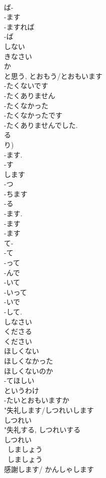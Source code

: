\documentclass[8pt]{extreport}
\begin{document}
\begin{CJK}{UTF8}{min}
\\	ば-
\\	-ます 
\\	-ますれば	
\\	-ば 
\\	しない			
\\	きなさい	
\\	か 
\\	と思う, とおもう/とおもいます 
\\	-たくないです 
\\	-たくありません			
\\	-たくなかった			
\\	-たくなかったです 
\\	-たくありませんでした.			
\\	る 
\\	り) 
\\	-ます. 
\\	-す 
\\	します
\\	-つ 
\\	-ちます
\\	-る 
\\	-ます.	
\\	-ます 
\\	-ます 
\\	て-
\\	-て
\\	-って
\\	-んで
\\	-いて
\\	-いって
\\	-いで
\\	-して.
\\	しなさい	
\\	くださる 
\\	ください			
\\	ほしくない			
\\	ほしくなかった			
\\	ほしくないのか			
\\	-てほしい			
\\	というわけ			
\\	-たいとおもいますか			
\\	"失礼します/しつれいします
\\	しつれい 
\\	"失礼する, しつれいする
\\	しつれい 
\\	~しましょう
\\	~しましょう
\\	感謝します/ かんしゃします			

\end{CJK}
\end{document}
